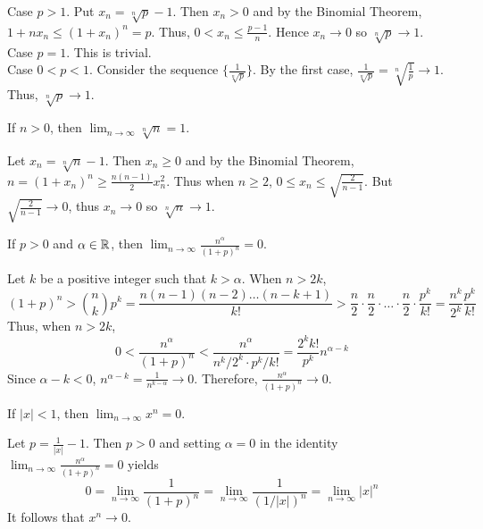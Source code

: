 \documentclass{mathnotes}
\begin{document}
\begin{pf}
  Case $p>1$. Put $x_n=\sqrt[n]{p}-1$. Then $x_n>0$ and by the Binomial
  Theorem, $1+nx_n\le(1+x_n)^n=p$. Thus, $0<x_n\le\frac{p-1}{n}$. Hence
  $x_n\to0$ so $\sqrt[n]{p}\to1$.\\
  Case $p=1$. This is trivial.\\
  Case $0<p<1$. Consider the sequence $\{\frac{1}{\sqrt[n]{p}}\}$. By the first
  case, $\frac{1}{\sqrt[n]{p}}=\sqrt[n]{\frac{1}{p}}\to1$. Thus,
  $\sqrt[n]{p}\to1$.
\end{pf}

\begin{prop}
  If $n>0$, then $\lim_{n\to\infty}\sqrt[n]{n}=1$.
\end{prop}

\begin{pf}
  Let $x_n=\sqrt[n]{n}-1$. Then $x_n\ge0$ and by the Binomial Theorem,
  $n=(1+x_n)^n\ge\frac{n(n-1)}{2}x_n^2$. Thus when $n\ge2$, $0\le
  x_n\le\sqrt{\frac{2}{n-1}}$. But $\sqrt{\frac{2}{n-1}}\to0$, thus $x_n\to 0$
  so $\sqrt[n]{n}\to1$.
\end{pf}

\begin{prop}
  If $p>0$ and $\alpha\in\mathbb{R}$, then
  $\lim_{n\to\infty}\frac{n^\alpha}{(1+p)^n}=0$.
\end{prop}

\begin{pf}
  Let $k$ be a positive integer such that $k>\alpha$. When $n>2k$,
  $$(1+p)^n>\binom{n}{k}p^k=\frac{n(n-1)(n-2)\ldots(n-k+1)}{k!}>
  \frac{n}{2}\cdot\frac{n}{2}\cdot\ldots\cdot\frac{n}{2}
  \cdot\frac{p^k}{k!}=\frac{n^k}{2^k}\frac{p^k}{k!}$$
  Thus, when $n>2k$,
  $$0<\frac{n^\alpha}{(1+p)^n}<\frac{n^\alpha}{n^k/2^k\cdot
  p^k/k!}=\frac{2^kk!}{p^k}n^{\alpha-k}$$
  Since $\alpha-k<0$, $n^{\alpha-k}=\frac{1}{n^{k-\alpha}}\to0$. Therefore,
  $\frac{n^\alpha}{(1+p)^n}\to0$.
\end{pf}

\begin{prop}
  If $|x|<1$, then $\lim_{n\to\infty}x^n=0$.
\end{prop}

\begin{pf}
  Let $p=\frac{1}{|x|}-1$. Then $p>0$ and setting $\alpha=0$ in the identity
  $\lim_{n\to\infty}\frac{n^\alpha}{(1+p)^n}=0$ yields
  $$0=\lim_{n\to\infty}\frac{1}{(1+p)^n}=\lim_{n\to\infty}\frac{1}{(1/|x|)^n}
  =\lim_{n\to\infty}|x|^n$$
  It follows that $x^n\to0$.
\end{pf}
\end{document}
